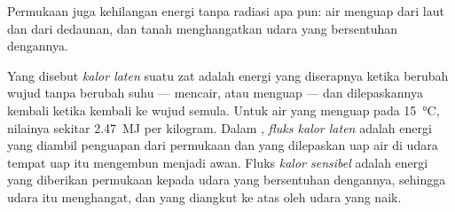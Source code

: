 Permukaan juga kehilangan energi tanpa radiasi apa pun: air menguap dari laut
dan dari dedaunan, dan tanah menghangatkan udara yang bersentuhan dengannya.

\begin{definition}\label{def:g10:earth-energy-budget:latent-heat}
Yang disebut \emph{kalor laten} suatu zat adalah energi
yang diserapnya ketika berubah wujud tanpa berubah suhu --- mencair, atau
menguap --- dan dilepaskannya kembali ketika kembali ke wujud semula. Untuk air
yang menguap pada \qty{15}{\degreeCelsius}, nilainya sekitar \qty{2.47}{MJ}
per kilogram. Dalam , \emph{fluks kalor laten} adalah energi yang
diambil penguapan dari permukaan dan yang dilepaskan uap air di udara tempat
uap itu mengembun menjadi awan. Fluks
\emph{kalor sensibel} adalah energi yang diberikan permukaan kepada udara yang
bersentuhan dengannya, sehingga udara itu menghangat, dan yang diangkut ke
atas oleh udara yang naik.
\end{definition}

